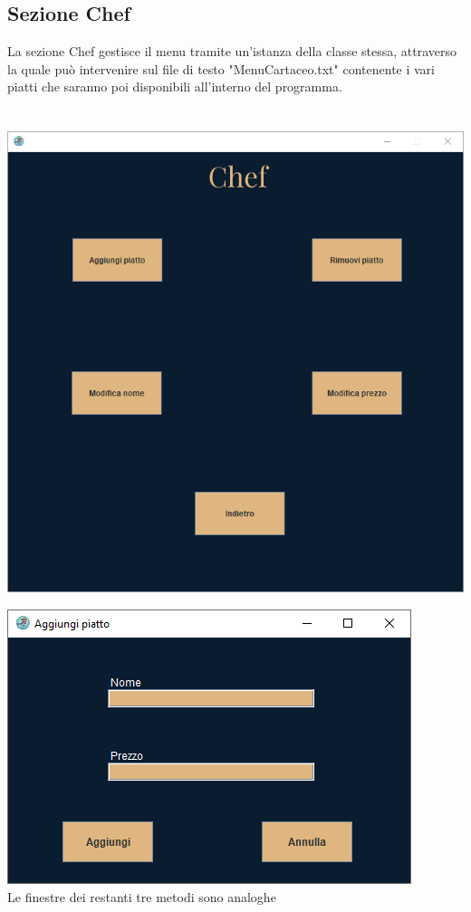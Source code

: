 \documentclass{article}
\begin{document}
    \subsection{Sezione Chef}
    La sezione Chef gestisce il menu tramite un'istanza della classe stessa, attraverso la quale può intervenire sul file di testo "MenuCartaceo.txt" contenente i vari piatti che saranno poi disponibili all'interno del programma.
    \\\\\\
    \includegraphics[width=\textwidth]{Chef.png}
    \\

    \begin{center}
        \includegraphics[scale=0.8]{ModificaChef.png}\\
        \caption{Le finestre dei restanti tre metodi sono analoghe}
    \end{center}
    
\end{document}

